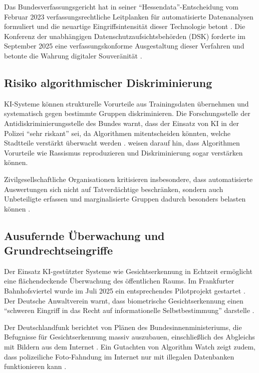 \documentclass[12pt,a4paper]{article}
\begin{document}
	Das Bundesverfassungsgericht hat in seiner \enquote{Hessendata}-Entscheidung vom Februar 2023 verfassungsrechtliche Leitplanken für automatisierte Datenanalysen formuliert und die neuartige Eingriffsintensität dieser Technologie betont \cite{VerfBlog2026}. Die Konferenz der unabhängigen Datenschutzaufsichtsbehörden (DSK) forderte im September 2025 eine verfassungskonforme Ausgestaltung dieser Verfahren und betonte die Wahrung digitaler Souveränität \cite{DSK2025}.
	
	\subsection{Risiko algorithmischer Diskriminierung}
	
	KI-Systeme können strukturelle Vorurteile aus Trainingsdaten übernehmen und systematisch gegen bestimmte Gruppen diskriminieren. Die Forschungsstelle der Antidiskriminierungsstelle des Bundes warnt, dass der Einsatz von KI in der Polizei \enquote{sehr riskant} sei, da Algorithmen mitentscheiden könnten, welche Stadtteile verstärkt überwacht werden \cite{Antidisk2025}. \cite{taz2026} weisen darauf hin, dass Algorithmen Vorurteile wie Rassismus reproduzieren und Diskriminierung sogar verstärken können.
	
	Zivilgesellschaftliche Organisationen kritisieren insbesondere, dass automatisierte Auswertungen sich nicht auf Tatverdächtige beschränken, sondern auch Unbeteiligte erfassen und marginalisierte Gruppen dadurch besonders belasten können \cite{Netzpolitik2025}.
	
	\subsection{Ausufernde Überwachung und Grundrechtseingriffe}
	
	Der Einsatz KI-gestützter Systeme wie Gesichtserkennung in Echtzeit ermöglicht eine flächendeckende Überwachung des öffentlichen Raums. Im Frankfurter Bahnhofsviertel wurde im Juli 2025 ein entsprechendes Pilotprojekt gestartet \cite{TOnline2025}. Der Deutsche Anwaltverein warnt, dass biometrische Gesichtserkennung einen \enquote{schweren Eingriff in das Recht auf informationelle Selbstbestimmung} darstelle \cite{DAV2025}.
	
	Der Deutschlandfunk berichtet von Plänen des Bundesinnenministeriums, die Befugnisse für Gesichtserkennung massiv auszubauen, einschließlich des Abgleichs mit Bildern aus dem Internet \cite{DLF2025}. Ein Gutachten von Algorithm Watch zeigt zudem, dass polizeiliche Foto-Fahndung im Internet nur mit illegalen Datenbanken funktionieren kann \cite{taz2025}.
	
\end{document}
